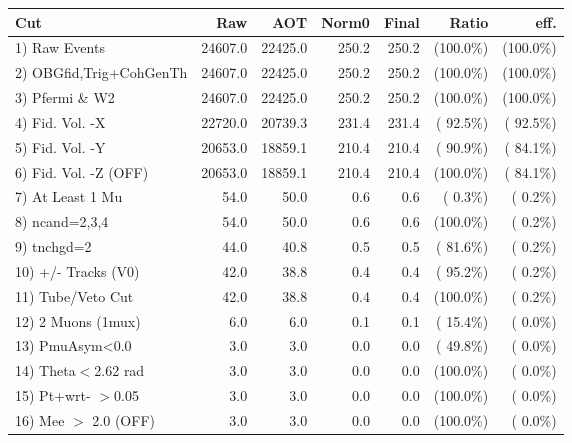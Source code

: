  \begin{table}[h!]\centering
 \begin{tabular}{||l||r|r|r|r|r|r||}
 \hline
 \hline
 Cut & Raw & AOT & Norm0 & Final & Ratio & eff.       \\
 \hline
  1) Raw Events           &      24607.0 &      22425.0 &        250.2 &        250.2 & (100.0\%) & (100.0\%) \\
  2) OBGfid,Trig+CohGenTh &      24607.0 &      22425.0 &        250.2 &        250.2 & (100.0\%) & (100.0\%) \\
  3) Pfermi \& W2         &      24607.0 &      22425.0 &        250.2 &        250.2 & (100.0\%) & (100.0\%) \\
  4) Fid. Vol. -X         &      22720.0 &      20739.3 &        231.4 &        231.4 & ( 92.5\%) & ( 92.5\%) \\
  5) Fid. Vol. -Y         &      20653.0 &      18859.1 &        210.4 &        210.4 & ( 90.9\%) & ( 84.1\%) \\
  6) Fid. Vol. -Z (OFF)   &      20653.0 &      18859.1 &        210.4 &        210.4 & (100.0\%) & ( 84.1\%) \\
  7) At Least 1 Mu        &         54.0 &         50.0 &          0.6 &          0.6 & (  0.3\%) & (  0.2\%) \\
  8) ncand=2,3,4          &         54.0 &         50.0 &          0.6 &          0.6 & (100.0\%) & (  0.2\%) \\
  9) tnchgd=2             &         44.0 &         40.8 &          0.5 &          0.5 & ( 81.6\%) & (  0.2\%) \\
 10) +/- Tracks (V0)      &         42.0 &         38.8 &          0.4 &          0.4 & ( 95.2\%) & (  0.2\%) \\
 11) Tube/Veto Cut        &         42.0 &         38.8 &          0.4 &          0.4 & (100.0\%) & (  0.2\%) \\
 12) 2 Muons (1mux)       &          6.0 &          6.0 &          0.1 &          0.1 & ( 15.4\%) & (  0.0\%) \\
 13) PmuAsym<0.0          &          3.0 &          3.0 &          0.0 &          0.0 & ( 49.8\%) & (  0.0\%) \\
 14) Theta$<$2.62 rad     &          3.0 &          3.0 &          0.0 &          0.0 & (100.0\%) & (  0.0\%) \\
 15) Pt+wrt- $>$0.05      &          3.0 &          3.0 &          0.0 &          0.0 & (100.0\%) & (  0.0\%) \\
 16) Mee $>$ 2.0  (OFF)   &          3.0 &          3.0 &          0.0 &          0.0 & (100.0\%) & (  0.0\%) \\

\end{tabular}
\end{table}
